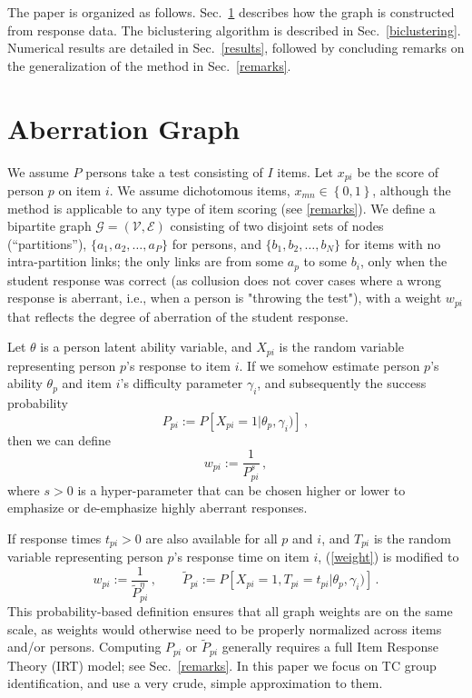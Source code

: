 \documentclass{article}
\newcommand{\cE}{\mathcal{E}}
\newcommand{\cG}{\mathcal{G}}
\newcommand{\cV}{\mathcal{V}}
\begin{document}
The paper is organized as follows. Sec.~\ref{model} describes how the graph is constructed from response data. The biclustering algorithm is described in Sec.~\ref{biclustering}. Numerical results are detailed in Sec.~\ref{results}, followed by concluding remarks on the generalization of the method in Sec.~\ref{remarks}.

\section{Aberration Graph}
\label{model}
We assume $P$ persons take a test consisting of $I$ items. Let $x_{pi}$ be the score of person $p$ on item $i$. We assume dichotomous items, $x_{mn} \in \left\{0,1\right\}$, although the method is applicable to any type of item scoring (see \ref{remarks}). We define a bipartite graph $\cG = (\cV, \cE)$ consisting of two disjoint sets of nodes (``partitions''), $\{a_1,a_2,\ldots,a_P\}$ for persons, and $\{b_1,b_2,\ldots,b_N\}$ for items with no intra-partition links; the only links are from some $a_p$ to some $b_i$, only when the student response was correct (as collusion does not cover cases where a wrong response is aberrant, i.e., when a person is "throwing the test"), with a weight $w_{pi}$ that reflects the degree of aberration of the student response.

Let $\theta$ is a person latent ability variable, and $X_{pi}$ is the random variable representing person $p$'s response to item $i$. If we somehow estimate person $p$'s ability $\theta_p$ and item $i$'s difficulty parameter $\gamma_i$, and subsequently the success probability
\begin{equation}
	P_{pi} := P \left [X_{pi}=1 | \theta_p, \gamma_i) \right]\,,
	\label{ppi} 
\end{equation}
then we can define
\begin{equation}
  w_{pi} := \frac{1}{P_{pi}^s} \,,
  \label{weight}
\end{equation}
where $s  > 0$ is a hyper-parameter that can be chosen higher or lower to emphasize or de-emphasize highly aberrant responses.

If response times $t_{pi} > 0$ are also available for all $p$ and $i$, and $T_{pi}$ is the random variable representing person $p$'s response time on item $i$, (\ref{weight}) is modified to
\begin{equation}
  w_{pi} := \frac{1}{\tilde{P}_{pi}^{\eta}}\,,\qquad \tilde{P}_{pi} := P \left[X_{pi}=1, T_{pi}=t_{pi} | \theta_p, \gamma_i) \right]\,.
\end{equation}
This probability-based definition ensures that all graph weights are on the same scale, as weights would otherwise need to be properly normalized across items and/or persons. Computing $P_{pi}$ or $\tilde{P}_{pi}$ generally requires a full Item Response Theory (IRT) model; see Sec.~\ref{remarks}. In this paper we focus on TC group identification, and use a very crude, simple approximation to them.
\end{document}
